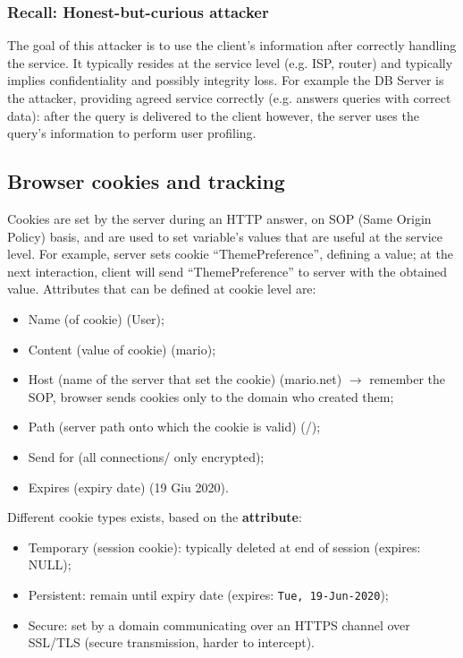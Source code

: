 \documentclass[a4paper, 10pt, titlepage]{article}
\begin{document}
\subsubsection*{Recall: Honest-but-curious attacker}
The goal of this attacker is to use the client’s information after correctly handling the service. It typically resides at the service level (e.g. ISP, router) and typically implies confidentiality and possibly integrity loss. For example the DB Server is the attacker, providing agreed service correctly (e.g. answers queries with correct data): after the query is delivered to the client however, the server uses the query’s information to perform user profiling.

\subsection{Browser cookies and tracking}
Cookies are set by the server during an HTTP answer, on SOP (Same Origin Policy) basis, and are used to set variable’s values that are useful at the service level. For example, server sets cookie “ThemePreference”, defining a value; at the next interaction, client will send “ThemePreference” to server with the obtained value. Attributes that can be defined at cookie level are:
\begin{itemize}
	\item Name (of cookie) (User);
	\item Content (value of cookie) (mario);
	\item Host (name of the server that set the cookie) (mario.net) $\rightarrow$ remember the SOP, browser sends cookies only to the domain who created them;
	\item Path (server path onto which the cookie is valid) (/);
	\item Send for (all connections/ only encrypted);
	\item Expires (expiry date) (19 Giu 2020).
\end{itemize}
Different cookie types exists, based on the \textbf{attribute}:
\begin{itemize}
	\item Temporary (session cookie): typically deleted at end of session (expires: NULL);
	\item Persistent: remain until expiry date (expires: \lstinline|Tue, 19-Jun-2020|);
	\item Secure: set by a domain communicating over an HTTPS channel over SSL/TLS (secure transmission, harder to intercept).
\end{itemize}
\end{document}
